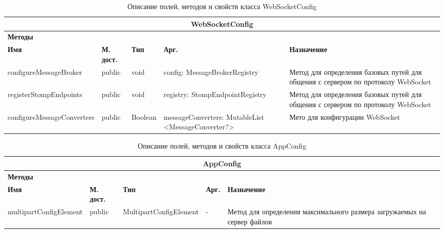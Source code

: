 \documentclass{../includes/TechDoc}
\begin{document}
    \begin{table}[h]
        \caption{\label{tab:class-WebSocketConfig-table}Описание полей, методов и свойств класса WebSocketConfig}
        \begin{tabularx}{\textwidth}{|l|l|l|p{4.3cm}|X|}
            \hline
            \multicolumn{5}{|c|}{WebSocketConfig} \\ \hline
            \multicolumn{5}{|l|}{\textbf{Методы}} \\ \hline
            \textbf{Имя}               & \textbf{М. дост.} & \textbf{Тип} & \textbf{Арг.}                                      & \textbf{Назначение}                                                               \\ \hline
            configureMessageBroker     & public            & void         & config: MessageBrokerRegistry                      & Метод для определения базовых путей для общения с сервером по протоколу WebSocket \\ \hline
            registerStompEndpoints     & public            & void         & registry: StompEndpointRegistry                    & Метод для определения базовых путей для общения с сервером по протоколу WebSocket \\ \hline
            configureMessageConverters & public            & Boolean      & messageConverters: MutableList <MessageConverter?>
            & Мето для конфигурации WebSocket
            \\ \hline
        \end{tabularx}
    \end{table}

    \begin{table}[h]
        \caption{\label{tab:class-AppConfig-table}Описание полей, методов и свойств класса AppConfig}
        \begin{tabularx}{\textwidth}{|l|l|l|l|X|}
            \hline
            \multicolumn{5}{|c|}{AppConfig} \\ \hline
            \multicolumn{5}{|l|}{\textbf{Методы}} \\ \hline
            \textbf{Имя}           & \textbf{М. дост.} & \textbf{Тип}           & \textbf{Арг.} & \textbf{Назначение}                                                      \\ \hline
            multipartConfigElement & public            & MultipartConfigElement & -             & Метод для определения максимального размера загружаемых на сервер файлов \\ \hline
        \end{tabularx}
    \end{table}
\end{document}
